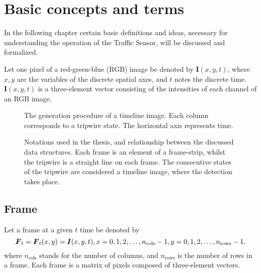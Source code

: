 \chapter{Basic concepts and terms}\label{chap:Concepts}
In the following chapter certain basic definitions and ideas, necessary for understanding the operation of the Traffic Sensor, will be discussed and formalized.

Let one pixel of a red-green-blue (RGB) image be denoted by $\boldsymbol{I}(x,y,t)$, where $x, y$ are the variables of the discrete spatial axes, and $t$ notes the discrete time.
$\boldsymbol{I}(x,y,t)$ is a three-element vector consisting of the intensities of each channel of an RGB image.
\begin{figure}[bh]
	\centering
	\scalebox{.7}{}
	\caption{The generation procedure of a timeline image. Each column corresponds to a tripwire state. The horizontal axis represents time.\label{fig:TI_creation}}
\end{figure}
\begin{figure}[h!]
	\centering
	\scalebox{.7}{}
	\caption{Notations used in the thesis, and relationship between the discussed data structures. Each frame is an element of a frame-strip, whilst the tripwire is a straight line on each frame. The consecutive states of the tripwire are considered a timeline image, where the detection takes place.	\label{fig:notations}}
\end{figure}
\section{Frame}
Let a frame at a given $t$ time be denoted by
\begin{displaymath}
	\boldsymbol{F}_t=\boldsymbol{F}_t(x,y)=\boldsymbol{I}(x,y,t),\\
	x=0,1,2,\dotsc,n_{\text{cols}}-1,\\
	y=0,1,2,\dotsc,n_{\text{rows}}-1,
\end{displaymath}
where $n_{\text{cols}}$ stands for the number of columns, and $n_{\text{rows}}$ is the number of rows in a frame.
Each frame is a matrix of pixels composed of three-element vectors. 

